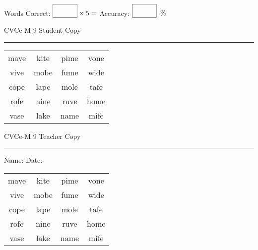 \documentclass{memoir}
\begin{document}
\small

Words Correct: $\fbox{\phantom{\huge 100}} \times 5 = $ Accuracy: $\fbox{\phantom{\huge 100}}\;\; \%$ 

\vfill

\newpage


\footnotesize \noindent
CVCe-M 9 \hfill Student Copy
\smallskip
\hrule

\Large

\setlength{\tabcolsep}{14pt}
\def\arraystretch{2}

{\selectfont


\begin{vplace}[0.5]
\begin{center}
\begin{tabular}{cccc}
mave & kite & pime & vone \\
vive & mobe & fume & wide \\
cope & lape & mole & tafe \\
rofe & nine & ruve & home \\
vase & lake & name & mife \\
\end{tabular}
\end{center}
\end{vplace}

}

\newpage

\footnotesize \noindent
CVCe-M 9 \hfill Teacher Copy
\smallskip
\hrule

\small

\vfill

\noindent
Name: \underline{\hspace{1.75in}} \hfill Date: \underline{\hspace{1in}}

\Large

{\selectfont


\begin{vplace}[0.5]
\begin{center}
\begin{tabular}{cccc}
mave & kite & pime & vone \\
vive & mobe & fume & wide \\
cope & lape & mole & tafe \\
rofe & nine & ruve & home \\
vase & lake & name & mife \\
\end{tabular}
\end{center}
\end{vplace}



}
\end{document}
